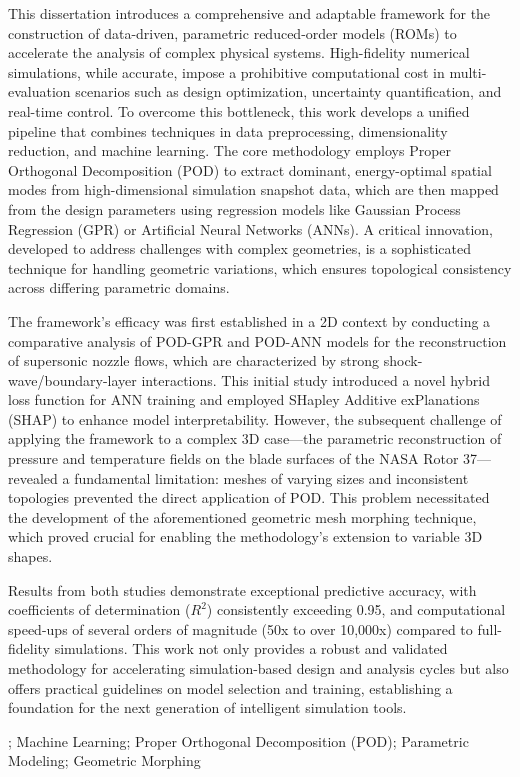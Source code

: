 \documentclass[dsc, EN]{ufabcFHZh}
\begin{document}
\begin{foreignabstract}

This dissertation introduces a comprehensive and adaptable framework for the construction of data-driven, parametric reduced-order models (ROMs) to accelerate the analysis of complex physical systems. High-fidelity numerical simulations, while accurate, impose a prohibitive computational cost in multi-evaluation scenarios such as design optimization, uncertainty quantification, and real-time control. To overcome this bottleneck, this work develops a unified pipeline that combines techniques in data preprocessing, dimensionality reduction, and machine learning. The core methodology employs Proper Orthogonal Decomposition (POD) to extract dominant, energy-optimal spatial modes from high-dimensional simulation snapshot data, which are then mapped from the design parameters using regression models like Gaussian Process Regression (GPR) or Artificial Neural Networks (ANNs). A critical innovation, developed to address challenges with complex geometries, is a sophisticated technique for handling geometric variations, which ensures topological consistency across differing parametric domains.

The framework's efficacy was first established in a 2D context by conducting a comparative analysis of POD-GPR and POD-ANN models for the reconstruction of supersonic nozzle flows, which are characterized by strong shock-wave/boundary-layer interactions. This initial study introduced a novel hybrid loss function for ANN training and employed SHapley Additive exPlanations (SHAP) to enhance model interpretability. However, the subsequent challenge of applying the framework to a complex 3D case—the parametric reconstruction of pressure and temperature fields on the blade surfaces of the NASA Rotor 37—revealed a fundamental limitation: meshes of varying sizes and inconsistent topologies prevented the direct application of POD. This problem necessitated the development of the aforementioned geometric mesh morphing technique, which proved crucial for enabling the methodology's extension to variable 3D shapes.

Results from both studies demonstrate exceptional predictive accuracy, with coefficients of determination ($R^2$) consistently exceeding 0.95, and computational speed-ups of several orders of magnitude (50x to over 10,000x) compared to full-fidelity simulations. This work not only provides a robust and validated methodology for accelerating simulation-based design and analysis cycles but also offers practical guidelines on model selection and training, establishing a foundation for the next generation of intelligent simulation tools.

\end{foreignabstract}
;
{Machine Learning};
{Proper Orthogonal Decomposition (POD)};
{Parametric Modeling};
{Geometric Morphing}
\end{document}
